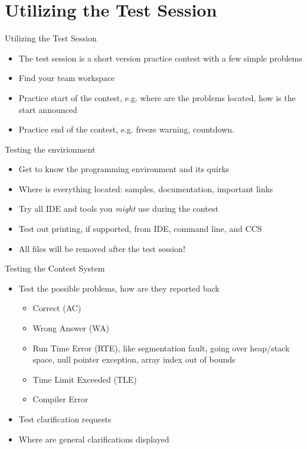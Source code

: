 \documentclass[11pt,pdf, aspectratio=169]{beamer}
\begin{document}
  \section{Utilizing the Test Session}
  \begin{frame}{Utilizing the Test Session}
    \begin{itemize}
      \item The test session is a short version practice contest with a few simple problems
      \item Find your team workspace
      \item Practice start of the contest, e.g. where are the problems located, how is the start announced
      \item Practice end of the contest, e.g. freeze warning, countdown.
    \end{itemize}
  \end{frame}
  \begin{frame}{Testing the envirionment}
    \begin{itemize}
      \item<1-> Get to know the programming environment and its quirks
      \item <2-> Where is everything located: samples, documentation, important links
      \item <3-> Try all IDE and tools you \textit{might} use during the contest
      \item <4-> Test out printing, if supported, from IDE, command line, and CCS
      \item <5-> All files will be removed after the test session!
    \end{itemize}
  \end{frame}
  \begin{frame}{Testing the Contest System}
    \begin{itemize}
      \item Test the possible problems, how are they reported back
      \begin{itemize}
        \item Correct (AC)
        \item Wrong Answer (WA)
        \item Run Time Error (RTE), like segmentation fault, going over heap/stack space, null pointer exception, array index out of bounds
        \item Time Limit Exceeded (TLE)
        \item Compiler Error
      \end{itemize}
      \item Test clarification requests
      \item Where are general clarifications displayed
    \end{itemize}
  \end{frame}
\end{document}
